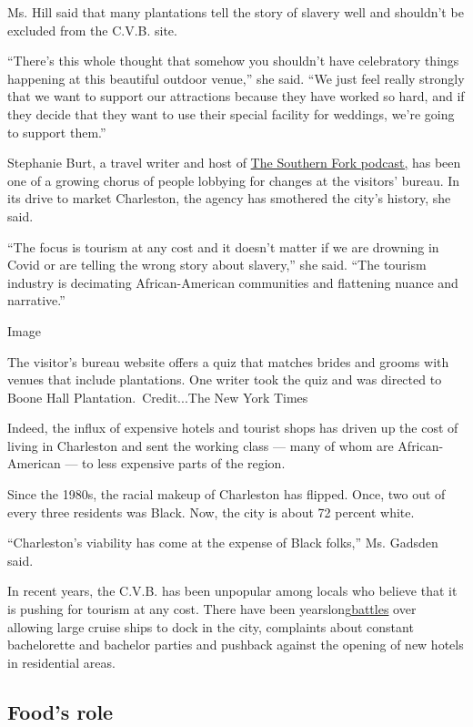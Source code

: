 Ms. Hill said that many plantations tell the story of slavery well and
shouldn't be excluded from the C.V.B. site.

``There's this whole thought that somehow you shouldn't have celebratory
things happening at this beautiful outdoor venue,'' she said. ``We just
feel really strongly that we want to support our attractions because
they have worked so hard, and if they decide that they want to use their
special facility for weddings, we're going to support them.''

Stephanie Burt, a travel writer and host of
\href{https://www.thesouthernfork.com/}{The Southern Fork podcast,} has
been one of a growing chorus of people lobbying for changes at the
visitors' bureau. In its drive to market Charleston, the agency has
smothered the city's history, she said.

``The focus is tourism at any cost and it doesn't matter if we are
drowning in Covid or are telling the wrong story about slavery,'' she
said. ``The tourism industry is decimating African-American communities
and flattening nuance and narrative.''

Image

The visitor's bureau website offers a quiz that matches brides and
grooms with venues that include plantations. One writer took the quiz
and was directed to Boone Hall Plantation.~Credit...The New York Times

Indeed, the influx of expensive hotels and tourist shops has driven up
the cost of living in Charleston and sent the working class --- many of
whom are African-American --- to less expensive parts of the region.

Since the 1980s, the racial makeup of Charleston has flipped. Once, two
out of every three residents was Black. Now, the city is about 72
percent white.

``Charleston's viability has come at the expense of Black folks,'' Ms.
Gadsden said.

In recent years, the C.V.B. has been unpopular among locals who believe
that it is pushing for tourism at any cost. There have been
yearslong\href{https://www.postandcourier.com/news/an-old-debate-over-cruise-ships-churns-as-a-new-ship-calls-charleston-harbor-home/article_013274d2-7674-11e9-b1c8-7b88d7ccc5c7.html}{battles}
over allowing large cruise ships to dock in the city, complaints about
constant bachelorette and bachelor parties and pushback against the
opening of new hotels in residential areas.

\hypertarget{foods-role}{%
\subsection{Food's role}\label{foods-role}}

